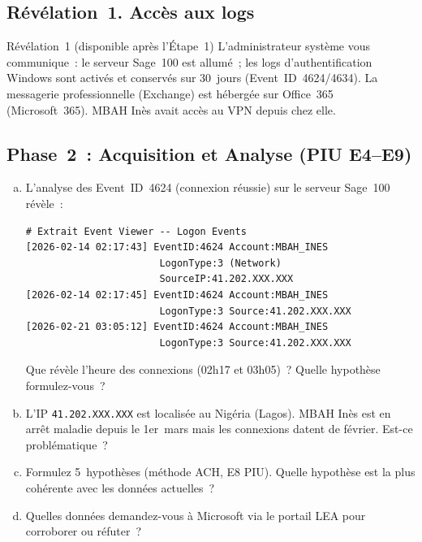 \subsection{Révélation~1. Accès aux logs}

\begin{boiteRemarque}{Révélation~1 (disponible après l'Étape~1)}
L'administrateur système vous communique~: le serveur Sage~100 est
allumé~; les logs d'authentification Windows sont activés et conservés
sur 30~jours (Event~ID~4624/4634). La messagerie professionnelle
(Exchange) est hébergée sur Office~365 (Microsoft~365). MBAH Inès
avait accès au VPN depuis chez elle.
\end{boiteRemarque}

\subsection{Phase~2~: Acquisition et Analyse (PIU E4--E9)}

\begin{boxexo}[title={\ding{45}\quad FAKO. Étape~2~: Investigation système}]
\begin{enumerate}[(a)]
    \item L'analyse des Event~ID~4624 (connexion réussie) sur le serveur
          Sage~100 révèle~:
\begin{lstlisting}[language=bash_forensique]
# Extrait Event Viewer -- Logon Events
[2026-02-14 02:17:43] EventID:4624 Account:MBAH_INES
                       LogonType:3 (Network)
                       SourceIP:41.202.XXX.XXX
[2026-02-14 02:17:45] EventID:4624 Account:MBAH_INES
                       LogonType:3 Source:41.202.XXX.XXX
[2026-02-21 03:05:12] EventID:4624 Account:MBAH_INES
                       LogonType:3 Source:41.202.XXX.XXX
\end{lstlisting}
          Que révèle l'heure des connexions (02h17 et 03h05)~?
          Quelle hypothèse formulez-vous~?
    \item L'IP \texttt{41.202.XXX.XXX} est localisée au Nigéria
          (Lagos). MBAH Inès est en arrêt maladie depuis le 1er~mars
          mais les connexions datent de février. Est-ce problématique~?
    \item Formulez 5~hypothèses (méthode ACH, E8 PIU). Quelle hypothèse
          est la plus cohérente avec les données actuelles~?
    \item Quelles données demandez-vous à Microsoft via le portail
          LEA pour corroborer ou réfuter~?
\end{enumerate}
\end{boxexo}


